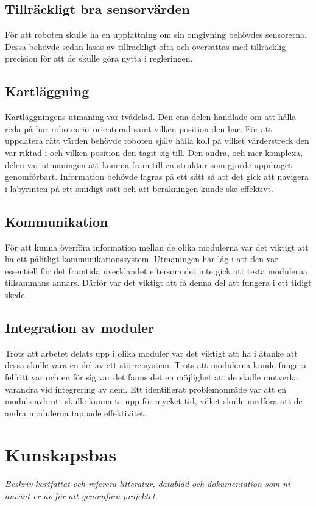 \documentclass[11pt]{article}
\begin{document}
\begin{flushleft}
\subsection{Tillräckligt bra sensorvärden}
För att roboten skulle ha en uppfattning om sin omgivning behövdes sensorerna. Dessa behövde sedan läsas av tillräckligt ofta och översättas med tillräcklig precision för att de skulle göra nytta i regleringen. 

\subsection{Kartläggning}
Kartläggningens utmaning var tvådelad. Den ena delen handlade om att hålla reda på hur roboten är orienterad samt vilken position den har. För att uppdatera rätt värden behövde roboten själv hålla koll på vilket värderstreck den var riktad i och vilken position den tagit sig till. Den andra, och mer komplexa, delen var utmaningen att komma fram till en struktur som gjorde uppdraget genomförbart. Information behövde lagras på ett sätt så att det gick att navigera i labyrinten på ett smidigt sätt och att beräkningen kunde ske effektivt.

\subsection{Kommunikation}
För att kunna överföra information mellan de olika modulerna var det viktigt att ha ett pålitligt kommunikationssystem. Utmaningen här låg i att den var essentiell för det framtida uvecklandet eftersom det inte gick att testa modulerna tillsammans annars. Därför var det viktigt att få denna del att fungera i ett tidigt skede.

\subsection{Integration av moduler}

Trots att arbetet delats upp i olika moduler var det viktigt att ha i åtanke att dessa skulle vara en del av ett större system. Trots att modulerna kunde fungera felfritt var och en för sig var det fanns det en möjlighet att de skulle motverka varandra vid integrering av dem. Ett identifierat problemområde var att en moduls avbrott skulle kunna ta upp för mycket tid, vilket skulle medföra att de andra modulerna tappade effektivitet. 


\pagebreak

\section{Kunskapsbas}
\textit{Beskriv kortfattat och referera litteratur, datablad och dokumentation som ni använt er av för att genomföra projektet.}


\end{flushleft}
\end{document}
